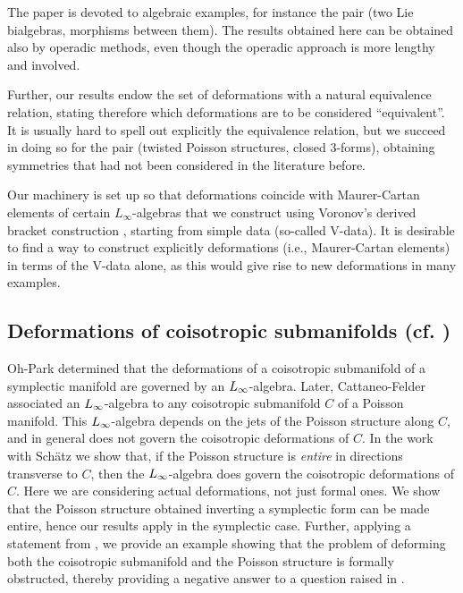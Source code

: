 \documentclass[11pt]{amsart}
\begin{document}
The paper \cite{FZalg} is devoted to algebraic examples, for instance  the pair (two Lie bialgebras, morphisms between them). The results obtained here  can be obtained also by operadic methods, even though the operadic approach is more lengthy and involved. 
 
Further, our results  endow the set of deformations with a natural equivalence relation, stating therefore 
which deformations are to be considered ``equivalent''. It is usually hard to spell out explicitly the equivalence relation, but we succeed in doing so for the pair (twisted Poisson structures, closed 3-forms), obtaining  symmetries that had not been considered in the literature before.  
 
Our machinery is set up so that  deformations coincide with Maurer-Cartan  
elements of certain $L_\infty$-algebras that we construct using  Voronov's derived bracket construction \cite{Vor}, starting from  simple data (so-called V-data). It is desirable to find a way to construct explicitly deformations (i.e., Maurer-Cartan   elements) in terms of the V-data alone, as this would give rise to new deformations in many examples. 

\subsection{Deformations of coisotropic submanifolds (cf. \cite{OPPois})} 
Oh-Park \cite{OP} determined that the
deformations of a coisotropic submanifold of a symplectic manifold are governed by an $L_{\infty}$-algebra. Later, Cattaneo-Felder \cite{CaFeCo2} associated an $L_{\infty}$-algebra to any coisotropic submanifold $C$ of a Poisson manifold. This $L_{\infty}$-algebra 
depends on the jets of the Poisson structure along $C$, and in general does not govern the coisotropic deformations of $C$. In the work \cite{OPPois} with Sch\"atz we show that, if the Poisson structure is \emph{entire} in directions transverse to $C$, then the $L_{\infty}$-algebra 
 does   govern the coisotropic deformations of $C$. Here we are considering   {actual deformations}, not just formal ones. We show that the Poisson structure obtained inverting a symplectic form can be made entire, hence our results apply in the symplectic case. Further, applying a statement from \cite{FZgeo}, we provide an example showing that the problem of deforming both the coisotropic submanifold and the Poisson structure is formally obstructed, thereby providing a negative 
  answer to a question raised in \cite{OP}.
\end{document}
